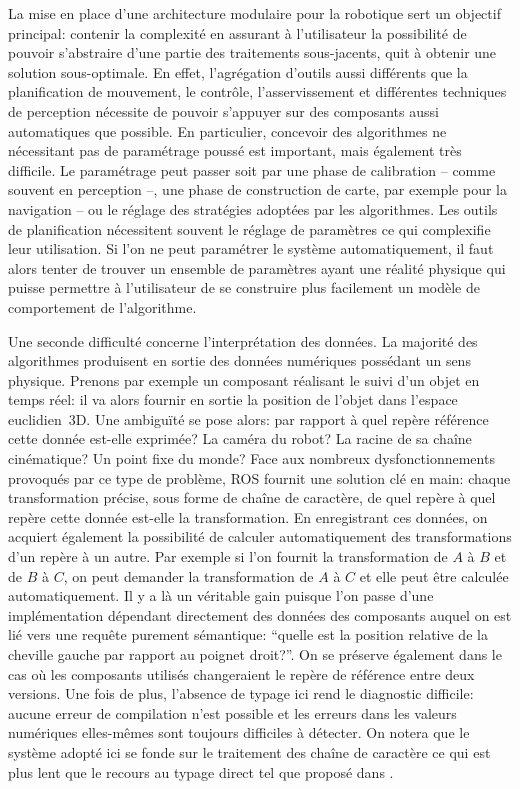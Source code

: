 La mise en place d'une architecture modulaire pour la robotique sert
un objectif principal: contenir la complexité en assurant à
l'utilisateur la possibilité de pouvoir s'abstraire d'une partie des
traitements sous-jacents, quit à obtenir une solution
sous-optimale. En effet, l'agrégation d'outils aussi différents que la
planification de mouvement, le contrôle, l'asservissement et
différentes techniques de perception nécessite de pouvoir s'appuyer
sur des composants aussi automatiques que possible. En particulier,
concevoir des algorithmes ne nécessitant pas de paramétrage poussé est
important, mais également très difficile. Le paramétrage peut passer
soit par une phase de calibration -- comme souvent en perception --,
une phase de construction de carte, par exemple pour la navigation --
ou le réglage des stratégies adoptées par les algorithmes. Les outils
de planification nécessitent souvent le réglage de paramètres ce qui
complexifie leur utilisation. Si l'on ne peut paramétrer le système
automatiquement, il faut alors tenter de trouver un ensemble de
paramètres ayant une réalité physique qui puisse permettre à
l'utilisateur de se construire plus facilement un modèle de
comportement de l'algorithme.


Une seconde difficulté concerne l'interprétation des données. La
majorité des algorithmes produisent en sortie des données numériques
possédant un sens physique. Prenons par exemple un composant réalisant
le suivi d'un objet en temps réel: il va alors fournir en sortie la
position de l'objet dans l'espace euclidien 3D. Une ambiguïté se pose
alors: par rapport à quel repère référence cette donnée est-elle
exprimée? La caméra du robot? La racine de sa chaîne cinématique? Un
point fixe du monde? Face aux nombreux dysfonctionnements provoqués
par ce type de problème, ROS fournit une solution clé en
main: chaque transformation précise, sous forme de chaîne de
caractère, de quel repère à quel repère cette donnée est-elle la
transformation. En enregistrant ces données, on acquiert également la
possibilité de calculer automatiquement des transformations d'un
repère à un autre. Par exemple si l'on fournit la transformation de
$A$ à $B$ et de $B$ à $C$, on peut demander la transformation de $A$ à
$C$ et elle peut être calculée automatiquement. Il y a là un véritable
gain puisque l'on passe d'une implémentation dépendant directement des
données des composants auquel on est lié vers une requête purement
sémantique: ``quelle est la position relative de la cheville gauche
par rapport au poignet droit?''. On se préserve également dans le cas
où les composants utilisés changeraient le repère de référence entre
deux versions. Une fois de plus, l'absence de typage ici rend le
diagnostic difficile: aucune erreur de compilation n'est possible et
les erreurs dans les valeurs numériques elles-mêmes sont toujours
difficiles à détecter. On notera que le système adopté ici se fonde
sur le traitement des chaîne de caractère ce qui est plus lent que le
recours au typage direct tel que proposé dans \cite{12delaet.ram}.


